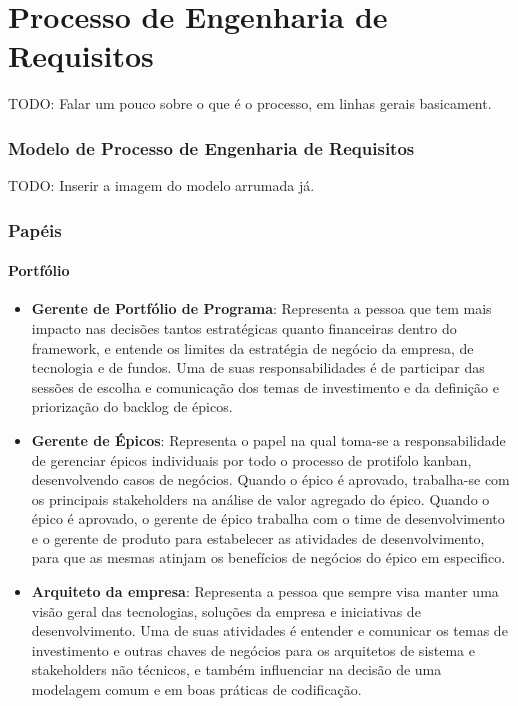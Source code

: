 \chapter{Processo de Engenharia de Requisitos}

  TODO: Falar um pouco sobre o que é o processo, em linhas gerais basicament.

\subsection{Modelo de Processo de Engenharia de Requisitos}
  
  TODO: Inserir a imagem do modelo arrumada já.

\subsection{Papéis}

\subsubsection {\textbf{Portfólio}}

  \begin{itemize}
    \item \textbf{Gerente de Portfólio de Programa}: Representa a pessoa que tem mais impacto nas decisões tantos estratégicas quanto financeiras dentro do framework, e entende os limites da estratégia de negócio da empresa, de tecnologia e de fundos. Uma de suas responsabilidades é de participar das sessões de escolha e comunicação dos temas de investimento e da definição e priorização do backlog de épicos.
    \item \textbf{Gerente de Épicos}: Representa o papel na qual toma-se a responsabilidade de gerenciar épicos individuais por todo o processo de protifolo kanban, desenvolvendo casos de negócios. Quando o épico é aprovado, trabalha-se com os principais stakeholders na análise de valor agregado do épico. Quando o épico é aprovado, o gerente de épico trabalha com o time de desenvolvimento e o gerente de produto para estabelecer as atividades de desenvolvimento, para que as mesmas atinjam os benefícios de negócios do épico em especifico.
    \item \textbf{Arquiteto da empresa}: Representa a pessoa que sempre visa manter uma visão geral das tecnologias, soluções da empresa e iniciativas de desenvolvimento. Uma de suas atividades é entender e comunicar os temas de investimento e outras chaves de negócios para os arquitetos de sistema e stakeholders não técnicos, e também influenciar na decisão de uma modelagem comum e em boas práticas de codificação.
  \end{itemize}

